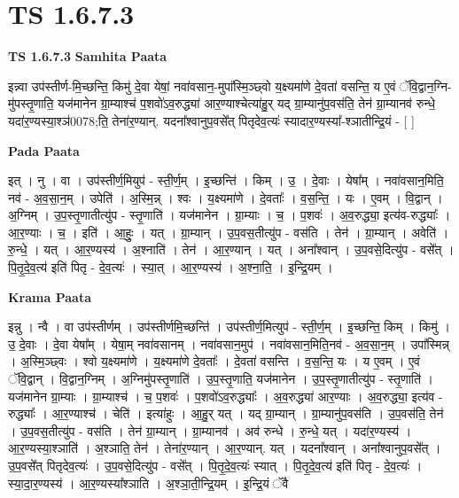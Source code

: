 \documentclass[17pt]{extarticle}
\begin{document}
\section{ TS 1.6.7.3 }

\textbf{TS 1.6.7.3 } \newline
\textbf{Samhita Paata} \newline

इन्न्वा उप॑स्तीर्ण-मि॒च्छन्ति॒ किमु॑ दे॒वा येषां॒ नवा॑वसान॒-मुपा᳚स्मि॒ञ्छ्वो य॒क्ष्यमा॑णे दे॒वता॑ वसन्ति॒ य ए॒वं ॅवि॒द्वान॒ग्नि-मु॑पस्तृ॒णाति॒ यज॑मानेन ग्रा॒म्याश्च॑ प॒शवो॑ऽव॒रुद्ध्या॑ आर॒ण्याश्चेत्या॑हु॒र् यद् ग्रा॒म्यानु॑प॒वस॑ति॒ तेन॑ ग्रा॒म्यानव॑ रुन्धे॒ यदा॑र॒ण्यस्या॒श्ञ॑0078;ति॒ तेना॑र॒ण्यान्. यदना᳚श्वानुप॒वसे᳚त् पितृदेव॒त्यः॑ स्यादार॒ण्यस्या᳚-श्ञातीन्द्रि॒यं - [ ] \newline

\textbf{Pada Paata} \newline

इत् । नु । वा । उप॑स्तीर्ण॒मियुप॑ - स्ती॒र्ण॒म् । इ॒च्छन्ति॑ । किम् । उ॒ । दे॒वाः । येषा᳚म् । नवा॑वसान॒मिति॒ नव॑ - अ॒व॒सा॒न॒म् । उपेति॑ । अ॒स्मि॒न्न् । श्वः । य॒क्ष्यमा॑णे । दे॒वताः᳚ । व॒स॒न्ति॒ । यः । ए॒वम् । वि॒द्वान् । अ॒ग्निम् । उ॒प॒स्तृ॒णातीत्यु॑प - स्तृ॒णाति॑ । यज॑मानेन । ग्रा॒म्याः । च॒ । प॒शवः॑ । अ॒व॒रुद्ध्या॒ इत्य॑व-रुद्ध्याः᳚ । आ॒र॒ण्याः । च॒ । इति॑ । आ॒हुः॒ । यत् । ग्रा॒म्यान् । उ॒प॒वस॒तीत्यु॑प - वस॑ति । तेन॑ । ग्रा॒म्यान् । अवेति॑ । रु॒न्धे॒ । यत् । आ॒र॒ण्यस्य॑ । अ॒श्नाति॑ । तेन॑ । आ॒र॒ण्यान् । यत् । अना᳚श्वान् । उ॒प॒वसे॒दित्यु॑प - वसे᳚त् । पि॒तृ॒दे॒व॒त्य॑ इति॑ पितृ - दे॒व॒त्यः॑ । स्या॒त् । आ॒र॒ण्यस्य॑ । अ॒श्ना॒ति॒ । इ॒न्द्रि॒यम् ।  \newline


\textbf{Krama Paata} \newline

इन्नु । न्वै । वा उप॑स्तीर्णम् । उप॑स्तीर्णमि॒च्छन्ति॑ । उप॑स्तीर्ण॒मित्युप॑ - स्ती॒र्ण॒म् । इ॒च्छन्ति॒ किम् । किमु॑ । उ॒ दे॒वाः । दे॒वा येषा᳚म् । येषा॒म् नवा॑वसानम् । नवा॑वसान॒मुप॑ । नवा॑वसान॒मिति॒नव॑ - अ॒व॒सा॒न॒म् । उपा᳚स्मिन्न् । अ॒स्मि॒ञ्छ्वः । श्वो य॒क्ष्यमा॑णे । य॒क्ष्यमा॑णे दे॒वताः᳚ । दे॒वता॑ वसन्ति । व॒स॒न्ति॒ यः । य ए॒वम् । ए॒वं ॅवि॒द्वान् । वि॒द्वान॒ग्निम् । अ॒ग्निमु॑पस्तृ॒णाति॑ । उ॒प॒स्तृ॒णाति॒ यज॑मानेन । उ॒प॒स्तृ॒णातीत्यु॑प - स्तृ॒णाति॑ । यज॑मानेन ग्रा॒म्याः । ग्रा॒म्याश्च॑ । च॒ प॒शवः॑ । प॒शवो॑ऽव॒रुद्ध्याः᳚ । अ॒व॒रुद्ध्या॑ आर॒ण्याः । अ॒व॒रुद्ध्या॒ इत्य॑व - रुद्ध्याः᳚ । आ॒र॒ण्याश्च॑ । चेति॑ । इत्या॑हुः । आ॒हु॒र् यत् । यद् ग्रा॒म्यान् । ग्रा॒म्यानु॑प॒वस॑ति । उ॒प॒वस॑ति॒ तेन॑ । उ॒प॒वस॒तीत्यु॑प - वस॑ति । तेन॑ ग्रा॒म्यान् । ग्रा॒म्यानव॑ । अव॑ रुन्धे । रु॒न्धे॒ यत् । यदा॑र॒ण्यस्य॑ । आ॒र॒ण्यस्या॒श्ञाति॑ । अ॒श्ञाति॒ तेन॑ । तेना॑र॒ण्यान् । आ॒र॒ण्यान्. यत् । यदना᳚श्वान् । अना᳚श्वानुप॒वसे᳚त् । उ॒प॒वसे᳚त् पितृदेव॒त्यः॑ । उ॒प॒वसे॒दित्यु॑प - वसे᳚त् । पि॒तृ॒दे॒व॒त्यः॑ स्यात् । पि॒तृ॒दे॒व॒त्य॑ इति॑ पितृ - दे॒व॒त्यः॑ । स्या॒दा॒र॒ण्यस्य॑ । आ॒र॒ण्यस्या᳚श्ञाति । अ॒श्ञा॒ती॒न्द्रि॒यम् । इ॒न्द्रि॒यं ॅवै \newline
\end{document}
